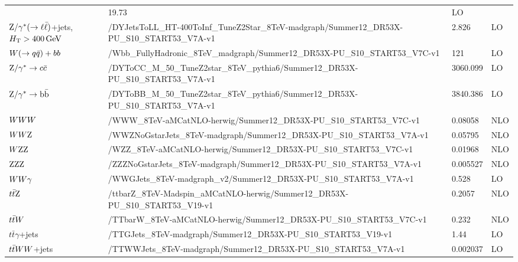 \begin{table}
\begin{center}
\begin{tabular}{l l l l}
& 19.73 & LO \\
$\mathrm{Z}/\gamma^* (\rightarrow \ell \bar{\ell})$+jets, $H_{\mathrm{T}} > 400\,\text{Ge\hspace{-.08em}V}$ &
/DYJetsToLL\_HT-400ToInf\_TuneZ2Star\_8TeV-madgraph/Summer12\_DR53X-PU\_S10\_START53\_V7A-v1
& 2.826 & LO \\
\midrule
$W(\rightarrow q\bar{q})+bb$ & 
/Wbb\_FullyHadronic\_8TeV\_madgraph/Summer12\_DR53X-PU\_S10\_START53\_V7C-v1 & 121 & LO \\
$\mathrm{Z}/\gamma^*\rightarrow c\bar{c}$ & 
/DYToCC\_M\_50\_TuneZ2star\_8TeV\_pythia6/Summer12\_DR53X-PU\_S10\_START53\_V7A-v1 & 3060.099 & LO \\
$\mathrm{Z}/\gamma^* \rightarrow \mathrm{b}\bar{\mathrm{b}}$ & 
/DYToBB\_M\_50\_TuneZ2star\_8TeV\_pythia6/Summer12\_DR53X-PU\_S10\_START53\_V7A-v1 & 3840.386 & LO \\
\midrule
$WWW$ & /WWW\_8TeV-aMCatNLO-herwig/Summer12\_DR53X-PU\_S10\_START53\_V7C-v1 & 0.08058 & NLO \\
$WW\mathrm{Z}$ & /WWZNoGstarJets\_8TeV-madgraph/Summer12\_DR53X-PU\_S10\_START53\_V7A-v1 & 0.05795 & NLO \\
$W\mathrm{Z}\mathrm{Z}$ & /WZZ\_8TeV-aMCatNLO-herwig/Summer12\_DR53X-PU\_S10\_START53\_V7C-v1 & 0.01968 & NLO \\
$\mathrm{Z}\mathrm{Z}\mathrm{Z}$ & /ZZZNoGstarJets\_8TeV-madgraph/Summer12\_DR53X-PU\_S10\_START53\_V7A-v1 & 0.005527 & NLO \\
$WW\gamma$ & /WWGJets\_8TeV-madgraph\_v2/Summer12\_DR53X-PU\_S10\_START53\_V7A-v1 & 0.528 & LO \\
\midrule
$t\bar{t}\mathrm{Z}$ & /ttbarZ\_8TeV-Madspin\_aMCatNLO-herwig/Summer12\_DR53X-PU\_S10\_START53\_V19-v1 
& 0.2057 & NLO \\
$t\bar{t}W$ & /TTbarW\_8TeV-aMCatNLO-herwig/Summer12\_DR53X-PU\_S10\_START53\_V7C-v1 & 0.232 & NLO \\
$t\bar{t}\gamma$+jets & /TTGJets\_8TeV-madgraph/Summer12\_DR53X-PU\_S10\_START53\_V19-v1 & 1.44 & LO \\
$t\bar{t}WW$+jets & /TTWWJets\_8TeV-madgraph/Summer12\_DR53X-PU\_S10\_START53\_V7A-v1 & 0.002037 & LO \\
\bottomrule
\end{tabular}
\end{center}
\label{tab:boost_mc_bg}
\end{table}

